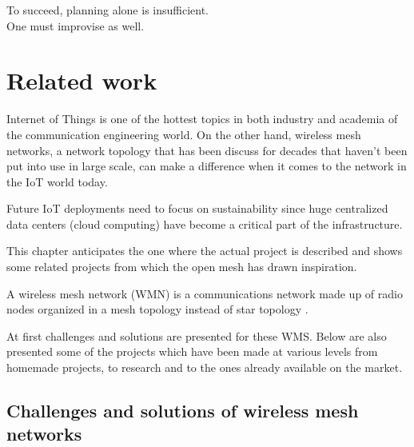 
\begin{savequote}[70mm]
	To succeed, planning alone is insufficient.\\One must improvise as well.
\end{savequote}


\chapter{Related work}\label{chapter:related_work}

	Internet  of  Things  is  one  of  the  hottest  topics  in 
	both  industry  and  academia  of  the  communication  engineering 
	world.
	On  the  other  hand,  wireless  mesh  networks,  a  network 
	topology that has been discuss for decades that haven’t been put 
	into use in large scale, can make a difference when it comes to the 
	network  in  the  IoT  world  today.

	Future IoT deployments need to focus on sustainability
	since huge centralized data centers (cloud computing) have
	become a critical part of the infrastructure.

	This chapter anticipates the one where the actual project is described and shows some related projects from which the open mesh has drawn inspiration.
	
	A  wireless  mesh  network  (WMN)  is  a  communications 
	network made up of radio nodes organized in a mesh topology 
	instead of star topology \cite{wms}.
	
	At first challenges and solutions are presented for these WMS.
	Below are also presented some of the projects which have been made at various levels from homemade projects, to research and to the ones already available on the market.
	
	\section{Challenges and solutions of wireless mesh networks}
		

